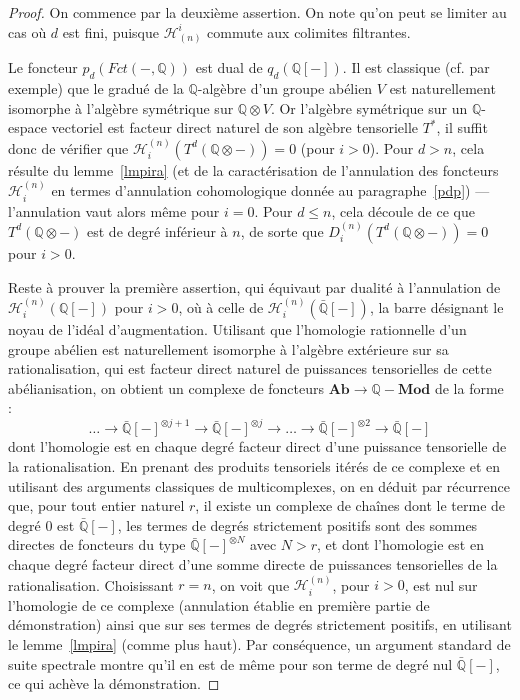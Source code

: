 \documentclass[a4paper,10pt]{article}
\newcommand{\Hh}{{\mathcal{H}}}
\theoremstyle{definition}
\theoremstyle{remark}
\begin{document}
\begin{proof}
 On commence par la deuxième assertion. On note qu'on peut se limiter au cas où $d$ est fini, puisque $\Hh_{(n)}^i$ commute aux colimites filtrantes.

Le foncteur $p_d(Fct(-,\mathbb{Q}))$ est dual de $q_d(\mathbb{Q}[-])$. Il est classique (cf. \cite{Passi} par exemple) que le gradué de la $\mathbb{Q}$-algèbre d'un groupe abélien $V$ est naturellement isomorphe à l'algèbre symétrique sur $\mathbb{Q}\otimes V$. Or l'algèbre symétrique sur un $\mathbb{Q}$-espace vectoriel est facteur direct naturel de son algèbre tensorielle $T^*$, il suffit donc de vérifier que $\Hh^{(n)}_i(T^d(\mathbb{Q}\otimes -))=0$ (pour $i>0$). Pour $d>n$, cela résulte du lemme~\ref{lmpira} (et de la caractérisation de l'annulation des foncteurs $\Hh^{(n)}_i$ en termes d'annulation cohomologique donnée au paragraphe~\ref{pdp}) --- l'annulation vaut alors même pour $i=0$. Pour $d\leq n$, cela découle de ce que $T^d(\mathbb{Q}\otimes -)$ est de degré inférieur à $n$, de sorte que $D^{(n)}_i(T^d(\mathbb{Q}\otimes -))=0$ pour $i>0$.

Reste à prouver la première assertion, qui équivaut par dualité à l'annulation de $\Hh^{(n)}_i(\mathbb{Q}[-])$ pour $i>0$, où à celle de $\Hh^{(n)}_i(\bar{\mathbb{Q}}[-])$, la barre désignant le noyau de l'idéal d'augmentation. Utilisant que l'homologie rationnelle d'un groupe abélien est naturellement isomorphe à l'algèbre extérieure sur sa rationalisation, qui est facteur direct naturel de puissances tensorielles de cette abélianisation, on obtient un complexe de foncteurs $\mathbf{Ab}\to\mathbb{Q}-\mathbf{Mod}$ de la forme :
$$\dots\to\bar{\mathbb{Q}}[-]^{\otimes j+1}\to\bar{\mathbb{Q}}[-]^{\otimes j}\to\dots\to\bar{\mathbb{Q}}[-]^{\otimes 2}\to\bar{\mathbb{Q}}[-]$$
dont l'homologie est en chaque degré facteur direct d'une puissance tensorielle de la rationalisation. En prenant des produits tensoriels itérés de ce complexe et en utilisant des arguments classiques de multicomplexes, on en déduit par récurrence que, pour tout entier naturel $r$, il existe un complexe de chaînes dont le terme de degré $0$ est $\bar{\mathbb{Q}}[-]$, les termes de degrés strictement positifs sont des sommes directes de foncteurs du type $\bar{\mathbb{Q}}[-]^{\otimes N}$ avec $N>r$, et dont l'homologie est en chaque degré facteur direct d'une somme directe de puissances tensorielles de la rationalisation. Choisissant $r=n$, on voit que $\Hh^{(n)}_i$, pour $i>0$, est nul sur l'homologie de ce complexe (annulation établie en première partie de démonstration) ainsi que sur ses termes de degrés strictement positifs, en utilisant le lemme~\ref{lmpira} (comme plus haut). Par conséquence, un argument standard de suite spectrale montre qu'il en est de même pour son terme de degré nul $\bar{\mathbb{Q}}[-]$, ce qui achève la démonstration.
\end{proof}
\end{document}
